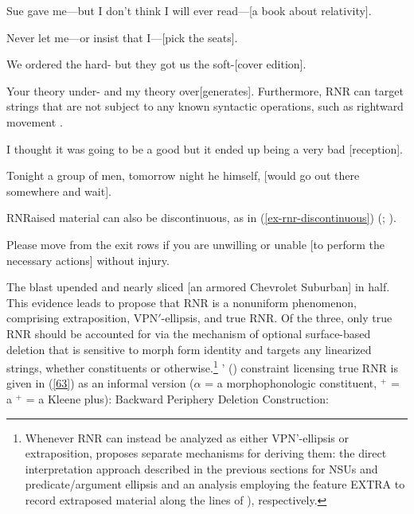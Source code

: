 {\eal
\ex Sue gave me---but I don't think I will ever read---[a book about relativity]. \label{54}

\ex Never let me---or insist that I---[pick the seats].\label{55}

\ex We ordered the hard- but they got us the soft-[cover edition].\label{56}

\ex Your theory under- and my theory over[generates].\label{57}\zl
%
Furthermore, RNR can target strings that are not subject to any known syntactic operations, such as rightward movement \citep[865]{Chaves2014}.

\eal
\ex I thought it was going to be a good but it ended up being a very bad [reception].\label{58}

\ex Tonight a group of men, tomorrow night he himself, [would go out there somewhere and wait].\label{59}\zl

RNRaised material can also be discontinuous, as in (\ref{ex-rnr-discontinuous}) (\citealt[868]{Chaves2014}; \citealt[238--240]{Whitman2009}).

\eal
\label{ex-rnr-discontinuous}
\ex Please move from the exit rows if you are unwilling or unable [to perform the necessary actions] without injury.\label{61}

\ex The blast upended and nearly sliced [an armored Chevrolet Suburban] in half.\label{62}\zl
%
This evidence leads \citet{Chaves2014} to propose that RNR is a nonuniform phenomenon, comprising extraposition,  VP\/N$'$-ellipsis, and true RNR.
%
%
%
Of the three, only true RNR should be accounted for via the mechanism of optional surface-based deletion that is sensitive to morph form identity and targets any linearized strings, whether constituents or otherwise.\footnote{Whenever RNR can instead be analyzed as either VP\/N'-ellipsis or extraposition, \citeauthor{Chaves2014} proposes separate mechanisms for deriving them: the direct interpretation approach described in the previous sections for NSUs and predicate/argument ellipsis and an analysis employing the feature EXTRA to record extraposed material along the lines of \citeauthor{KimSag2005, Kay2012}), respectively.} \citeauthor{Chaves2014}' (\citeyear[874]{Chaves2014}) constraint licensing true RNR is given in (\ref{63}) as an informal version  ($\alpha$
= a morphophonologic constituent, $^{+}$ = a
 $^{+}$ = a Kleene plus):
%
%
%
%
\ea
\label{63}
 Backward Periphery Deletion Construction:\\

}
